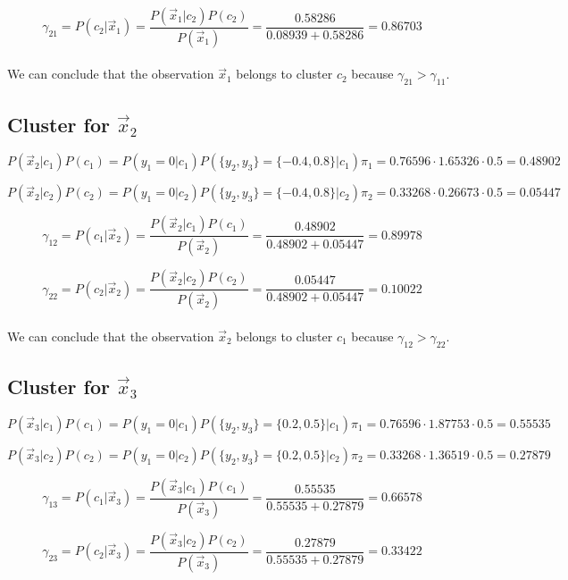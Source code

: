 \documentclass{article}
\begin{document}
\[ \gamma_{21} = P(c_2| \vec{x}_1) = \frac{P(\vec{x}_1 | c_2) P(c_2)}{P(\vec{x}_1)} = \frac{0.58286}{0.08939 + 0.58286} = 0.86703 \]

\paragraph{} We can conclude that the observation $\vec{x}_1$ belongs to cluster $c_2$ because $\gamma_{21} > \gamma_{11}$.

\subsection*{Cluster for $\vec{x}_2$}

\[ P(\vec{x}_2 | c_1) P(c_1) = P(y_1 = 0 | c_1) P(\{y_2, y_3\}  = \{-0.4, 0.8\} | c_1) \pi_1 = 0.76596 \cdot 1.65326 \cdot 0.5 = 0.48902 \]

\[ P(\vec{x}_2 | c_2) P(c_2) = P(y_1 = 0 | c_2) P(\{y_2, y_3\}  = \{-0.4, 0.8\} | c_2) \pi_2 = 0.33268 \cdot 0.26673 \cdot 0.5 = 0.05447 \]

\[ \gamma_{12} = P(c_1| \vec{x}_2) = \frac{P(\vec{x}_2 | c_1) P(c_1)}{P(\vec{x}_2)} = \frac{0.48902}{0.48902 + 0.05447} = 0.89978 \]

\[ \gamma_{22} = P(c_2| \vec{x}_2) = \frac{P(\vec{x}_2 | c_2) P(c_2)}{P(\vec{x}_2)} = \frac{0.05447}{0.48902 + 0.05447} = 0.10022 \]

\paragraph{} We can conclude that the observation $\vec{x}_2$ belongs to cluster $c_1$ because $\gamma_{12} > \gamma_{22}$.

\subsection*{Cluster for $\vec{x}_3$}

\[ P(\vec{x}_3 | c_1) P(c_1) = P(y_1 = 0 | c_1) P(\{y_2, y_3\}  = \{0.2, 0.5\} | c_1) \pi_1 = 0.76596 \cdot 1.87753 \cdot 0.5 = 0.55535 \]

\[ P(\vec{x}_3 | c_2) P(c_2) = P(y_1 = 0 | c_2) P(\{y_2, y_3\}  = \{0.2, 0.5\} | c_2) \pi_2 = 0.33268 \cdot 1.36519 \cdot 0.5 = 0.27879 \]

\[ \gamma_{13} = P(c_1| \vec{x}_3) = \frac{P(\vec{x}_3 | c_1) P(c_1)}{P(\vec{x}_3)} = \frac{0.55535}{0.55535 + 0.27879} = 0.66578 \]

\[ \gamma_{23} = P(c_2| \vec{x}_3) = \frac{P(\vec{x}_3 | c_2) P(c_2)}{P(\vec{x}_3)} = \frac{0.27879}{0.55535 + 0.27879} = 0.33422 \]
\end{document}
